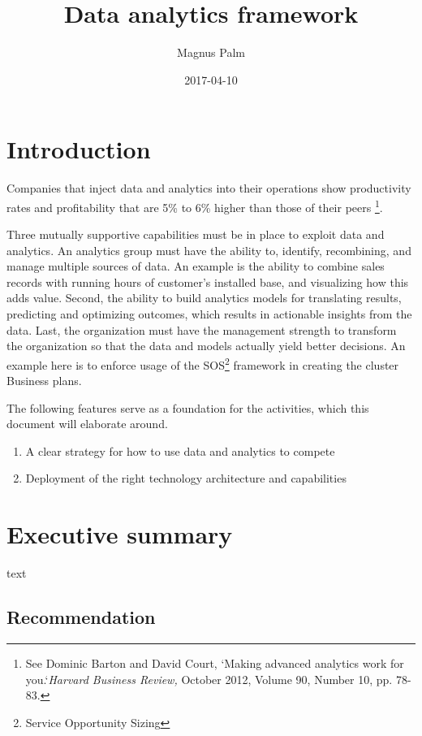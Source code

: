 \documentclass[10pt]{article} %
\title{Data analytics framework}
\author{Magnus Palm}
\date{2017-04-10} %
\begin{document}
\maketitle

\section*{Introduction}
Companies that inject data and analytics into their operations show productivity rates and profitability that are 5\% to 6\% higher than those of their peers \footnote{See Dominic Barton and David Court, `Making advanced analytics work for you.`\textit{Harvard Business Review,} October 2012, Volume 90, Number 10, pp. 78-83.}.

Three mutually supportive capabilities must be in place to exploit data and analytics. An analytics group must have the ability to, identify, recombining, and manage multiple sources of data. An example is the ability to combine sales records with running hours of customer's installed base, and visualizing how this adds value. Second, the ability to build analytics models for translating results, predicting and optimizing outcomes, which results in actionable insights from the data. Last, the organization must have the management strength to transform the organization so that the data and models actually yield better decisions. An example here is to enforce usage of the SOS\footnote{Service Opportunity Sizing} framework in creating the cluster Business plans.

The following features serve as a foundation for the activities, which this document will elaborate around.


\begin{enumerate}
\item A clear strategy for how to use data and analytics to compete
\item Deployment of the right technology architecture and capabilities
\end{enumerate}


\tableofcontents
\listoffigures
\listoftables

\section{Executive summary}
text

\subsection{Recommendation}
\end{document}
